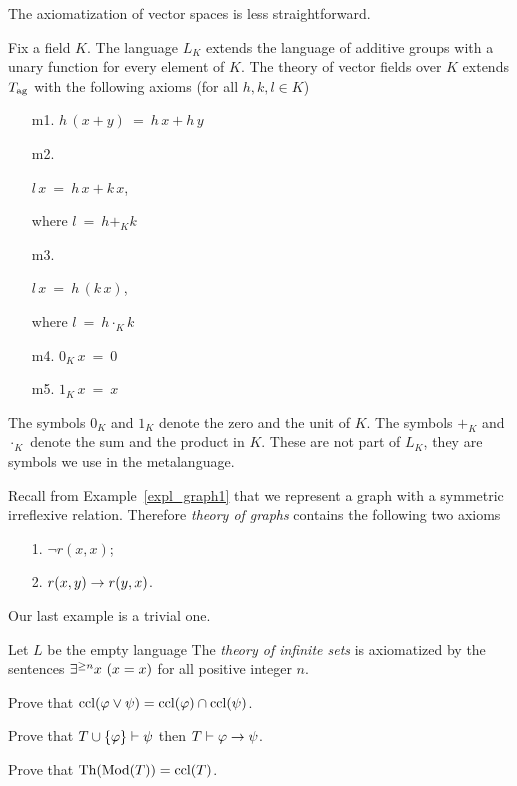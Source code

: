 \documentclass[creche.tex]{subfiles}
\begin{document}
The axiomatization of vector spaces is less straightforward.

\begin{example}
Fix a field $K$. The language $L_K$ extends the language of additive groups with a unary function for every element of $K$. The theory of vector fields over $K$ extends $T_{\rm ag}$ with the following axioms (for all $h,k,l\in K$)
\begin{itemize}
\item[m1.] $h\,(x+y)\ =\ h\,x+h\,y$
\item[m2.] \parbox{25ex}{$l\,x\ =\ h\,x+k\,x$,} where $l\ =\ h+_Kk$
\item[m3.] \parbox{25ex}{$l\,x\ =\ h\,(k\,x)$,} where $l\ =\ h\cdot_Kk$
\item[m4.] $0_K\,x\ =\ 0$
\item[m5.] $1_K\,x\ =\ x$
\end{itemize}
The symbols $0_K$ and $1_K$ denote the zero and the unit of $K$. The symbols $+_K$ and $\cdot_K$ denote the sum and the product in $K$. These are not part of $L_K$, they are symbols we use in the metalanguage.\QED
\end{example}

\begin{example}\label{expl_Tgraphs}
Recall from Example~\ref{expl_graph1} that we represent a graph with a symmetric irreflexive relation. Therefore \emph{theory of graphs\/} contains the following two axioms

\begin{itemize}
\item[1.] $\neg r(x,x)$;
\item[2.] $r(x,y)\rightarrow r(y,x)$.\QED
\end{itemize}
\end{example}

Our last example is a trivial one.

\begin{example}
Let $L$ be the empty language The \emph{theory of infinite sets\/} is axiomatized by the sentences $\E^{\ge n} x\ (x=x)$ for all positive integer $n$.\QED
\end{example}


\begin{exercise}
Prove that ${\rm ccl}(\varphi\vee \psi)={\rm ccl}(\varphi)\cap{\rm ccl}(\psi)$.\QED
\end{exercise}

\begin{exercise}\label{modus ponens}
Prove that $T\cup\{\varphi\}\vdash\psi$ then $T\vdash\varphi\rightarrow\psi$.\QED
\end{exercise}


\begin{exercise}
Prove that $\textrm{Th}(\mathop{\rm Mod}(T))={\rm ccl}(T)$.\QED
\end{exercise}
\end{document}
